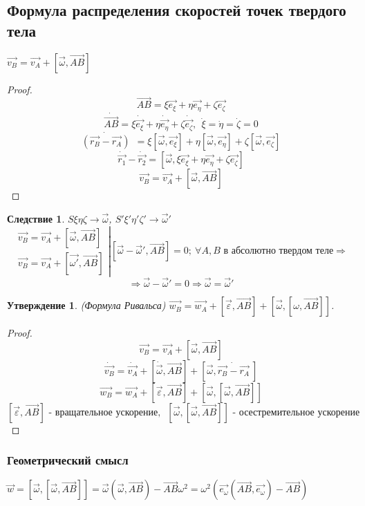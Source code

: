 \documentclass{article}
\newtheorem{ass}{Утверждение}
\newtheorem*{cor}{Следствие}
\begin{document}
  \subsection{Формула распределения скоростей точек твердого тела}
  $ \vec{v_B} = \vec{v_A} + [\vec{\omega}, \vec{AB}] $
  \begin{proof}
  $$ \vec{AB} = \xi \vec{e_{\xi}} + \eta \vec{e_{\eta}} + \zeta \vec{e_{\zeta}} $$
  $$ \dot{\vec{AB}} = \xi \dot{\vec{e_{\xi}}} + \eta \dot{\vec{e_{\eta}}} + \zeta \dot{\vec{e_{\zeta}}},~~ \dot{\xi} = \dot{\eta} = \dot{\zeta} = 0 $$
  $$ \dot{\left(\vec{r_B} - \vec{r_A}\right)}~~ = \xi[\vec{\omega}, \vec{e_{\xi}}] + \eta[\vec{\omega}, \vec{e_{\eta}}] + \zeta[\vec{\omega}, \vec{e_{\zeta}}] $$ 
  $$ \dot{\vec{r_1}} - \dot{\vec{r_2}} = [\vec{\omega}, \xi \vec{e_{\xi}} + \eta \vec{e_{\eta}} + \zeta \vec{e_{\zeta}}] $$
  $$ \vec{v_B} = \vec{v_A} + [\vec{\omega}, \vec{AB}] $$  
  \end{proof}
  
  \begin{cor}
  $S\xi\eta\zeta \rightarrow \vec{\omega}$, $S'\xi'\eta'\zeta' \rightarrow \vec{\omega}'$
  $$ 
  \left.
  \begin{array}{ccc}
  \vec{v_B} = \vec{v_A} + [\vec{\omega}, \vec{AB}] \\
  \vec{v_B} = \vec{v_A} + [\vec{\omega'}, \vec{AB}]
  \end{array}
  \right|
  [\vec{\omega} - \vec{\omega}', \vec{AB}] = 0;~ \forall A, B \text{ в абсолютно твердом теле} \Rightarrow
  $$
  $$ \Rightarrow \vec{\omega} - \vec{\omega}' = 0 \Rightarrow \boxed{\vec{\omega} = \vec{\omega}'} $$
  \end{cor}
  
  \begin{ass}(Формула Ривальса) $ \vec{w_B} = \vec{w_A} + [\vec{\varepsilon}, \vec{AB}] + [\vec{\omega}, [\omega, \vec{AB}]] $.
  \end{ass}
  \begin{proof}
  $$ \vec{v_B} = \vec{v_A} + [\vec{\omega}, \vec{AB}] $$
  $$ \dot{\vec{v_B}} = \dot{\vec{v_A}} + [\dot{\vec{\omega}}, \vec{AB}] + [\vec{\omega}, \dot{\vec{r_B} - \vec{r_A}}~]  $$
  $$ \vec{w_B} = \vec{w_A} + [\vec{\varepsilon}, \vec{AB}] + [\vec{\omega}, [\vec{\omega}, \vec{AB}]]  $$
  $$ [\vec{\varepsilon}, \vec{AB}] \text{ - вращательное ускорение,~~} [\vec{\omega}, [\vec{\omega}, \vec{AB}]] \text{ - осестремительное ускорение} $$ 
  \end{proof}
  
  \subsubsection{Геометрический смысл}
  $ \vec{w} = [\vec{\omega}, [\vec{\omega}, \vec{AB}]] = \vec{\omega} (\vec{\omega}, \vec{AB}) - \vec{AB} \omega^2 = \omega^2 ( \vec{e_{\omega}}(\vec{AB}, \vec{e_{\omega}}) - \vec{AB}) $
  
\end{document}
